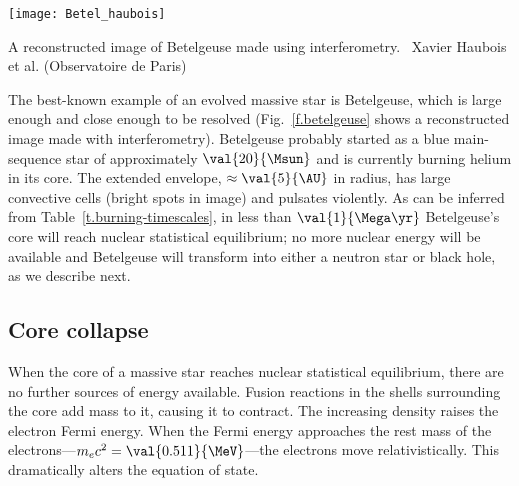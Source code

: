 \begin{marginfigure}
\texttt{[image: Betel\_haubois]}
\caption[Betelgeuse]{\label{f.betelgeuse} A reconstructed image of Betelgeuse made using interferometry. \imgcred\ Xavier Haubois et al. (Observatoire de Paris)}
\end{marginfigure}
The best-known example of an evolved massive star is Betelgeuse, which is large enough and close enough to be resolved (Fig.~\ref{f.betelgeuse} shows a reconstructed image made with interferometry). Betelgeuse probably started as a blue main-sequence star of approximately $\val{20}{\Msun}$ and is currently burning helium in its core. The extended envelope, $\approx\val{5}{\AU}$ in radius, has large convective cells (bright spots in image) and pulsates violently. As can be inferred from Table~\ref{t.burning-timescales}, in less than $\val{1}{\Mega\yr}$ Betelgeuse's core will reach nuclear statistical equilibrium; no more nuclear energy will be available and Betelgeuse will transform into either a neutron star or black hole, as we describe next.

\subsection{Core collapse}
When the core of a massive star reaches nuclear statistical equilibrium, there are no further sources of energy available. Fusion reactions in the shells surrounding the core add mass to it, causing it to contract. The increasing density raises the electron Fermi energy. When the Fermi energy approaches the rest mass of the electrons---$m_{e}c^{2} = \val{0.511}{\MeV}$---the electrons move relativistically. This dramatically alters the equation of state.

